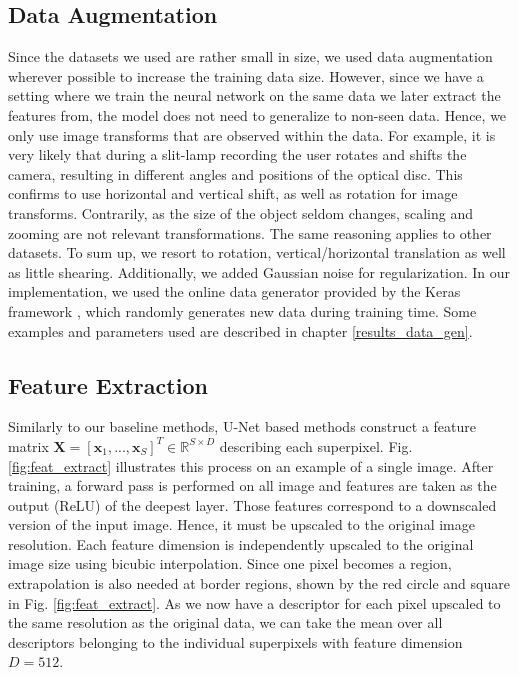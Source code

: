 \subsection{Data Augmentation} \label{ch:data_gen}
Since the datasets we used are rather small in size, we used data augmentation wherever possible to increase the training data size. However, since we have a setting where we train the neural network on the same data we later extract the features from, the model does not need to generalize to non-seen data. Hence, we only use image transforms that are observed within the data. For example, it is very likely that during a slit-lamp recording the user rotates and shifts the camera, resulting in different angles and positions of the optical disc. This confirms to use horizontal and vertical shift, as well as rotation for image transforms. Contrarily, as the size of the object seldom changes, scaling and zooming are not relevant transformations.
The same reasoning applies to other datasets.
To sum up, we resort to rotation, vertical/horizontal translation as well as little shearing. Additionally, we added Gaussian noise for regularization. In our implementation, we used the online data generator provided by the Keras framework \cite{Keras}, which randomly generates new data during training time. Some examples and parameters used are described in chapter \ref{results_data_gen}.

\clearpage
\subsection{Feature Extraction} \label{feat_extract}
Similarly to our baseline methods, U-Net based methods construct a feature matrix $\boldsymbol{X} = [\boldsymbol{x}_1,...,\boldsymbol{x}_S]^T \in \mathbb{R}^{S \times D}$ describing each superpixel. Fig. \ref{fig:feat_extract} illustrates this process on an example of a single image. After training, a forward pass is performed on all image and features are taken as the output (ReLU) of the deepest layer. Those features correspond to a downscaled version of the input image. Hence, it must be upscaled to the original image resolution. Each feature dimension is independently upscaled to the original image size using bicubic interpolation. Since one pixel becomes a region, extrapolation is also needed at border regions, shown by the red circle and square in Fig. \ref{fig:feat_extract}. As we now have a descriptor for each pixel upscaled to the same resolution as the original data, we can take the mean over all descriptors belonging to the individual superpixels with feature dimension $D=512$.
\vspace{10pt}

